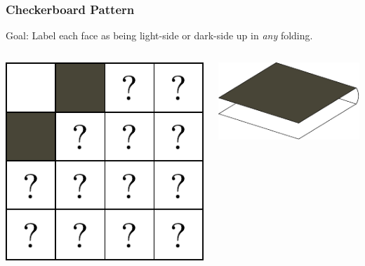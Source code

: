 \documentclass{beamer}
\begin{document}
\begin{frame}
\frametitle{Checkerboard Pattern}

\begin{block}{Goal:}
Label each face as being light-side or dark-side up in \textit{any} folding.
\end{block}

\bigskip

\begin{columns}[c]
\includegraphics[width=\textwidth]{sam_images/checkerboard-3b.pdf}

\includegraphics[width=.9\textwidth]{sam_images/checkerboard-3a.pdf}


\end{columns}
\end{frame}
\end{document}
